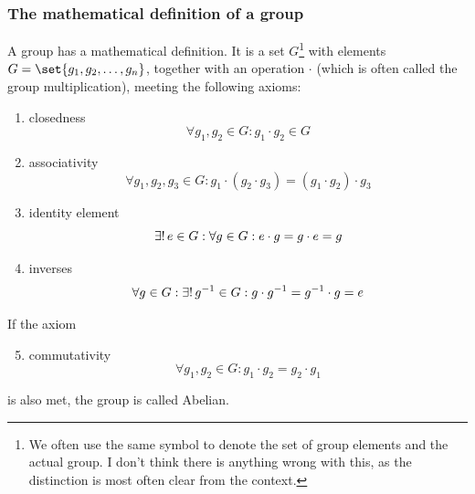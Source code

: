         \subsubsection{The mathematical definition of a group} \label{sec:group_def}
            A group has a mathematical definition. It is a set $G$\footnote{We often use the same symbol to denote the set of group elements and the actual group. I don't think there is anything wrong with this, as the distinction is most often clear from the context.} with elements $G=\set{g_1, g_2, \dots, g_n}$, together with an operation $\cdot$ (which is often called the group multiplication), meeting the following axioms:
            \begin{enumerate}
                \item closedness
                \begin{equation}
                    \forall g_1, g_2 \in G: g_1 \cdot g_2 \in G
                \end{equation}

                \item associativity
                \begin{equation}
                    \forall g_1, g_2, g_3 \in G: g_1 \cdot (g_2 \cdot g_3) = (g_1 \cdot g_2) \cdot g_3
                \end{equation}

                \item identity element
                \begin{equation} \label{eq:group_id}
                    \exists! \thinspace e \in G: \forall g \in G: e \cdot g = g \cdot e = g
                \end{equation}

                \item inverses
                \begin{equation}
                    \forall g \in G: \exists! \thinspace g^{-1} \in G: g \cdot g^{-1} = g^{-1} \cdot g = e
                \end{equation}
            \end{enumerate}
            If the axiom
            \begin{enumerate}
                \setcounter{enumi}{4}
                \item commutativity
                \begin{equation}
                    \forall g_1, g_2 \in G: g_1 \cdot g_2 = g_2 \cdot g_1
                \end{equation}
            \end{enumerate}
            is also met, the group is called Abelian. \\


